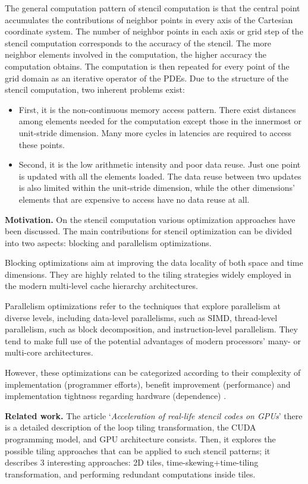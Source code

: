 \documentclass[conference]{IEEEtran}
\newcommand{\mypar}[1]{{\bf #1.}}
\begin{document}
The general computation pattern of stencil computation is that the central point accumulates the contributions of neighbor points in every axis of the Cartesian coordinate system.\cite{su-zhang-mei} The number of neighbor points in each axis or grid step of the stencil computation corresponds to the accuracy of the stencil. The more neighbor elements involved in the computation, the higher accuracy the computation obtains. The computation is then repeated for every point of the grid domain as an iterative operator of the PDEs. Due to the structure of the stencil computation, two inherent problems exist:
\begin{itemize}
	\item First, it is the non-continuous memory access pattern. There exist distances among elements needed for the computation except those in the innermost or unit-stride dimension. Many more cycles in latencies are required to access these points. 
	\item Second, it is the low arithmetic intensity and poor data reuse. Just one point is updated with all the elements loaded. The data reuse between two updates is also limited within the unit-stride dimension, while the other dimensions' elements that are expensive to access have no data reuse at all.
\end{itemize}


\mypar{Motivation} 
On the stencil computation various optimization approaches have been discussed. The main contributions for stencil optimization can be divided into two aspects: blocking and parallelism optimizations.\cite{su-zhang-mei}

Blocking optimizations aim at improving the data locality of both space and time dimensions. They are highly related to the tiling strategies widely employed in the modern multi-level cache hierarchy architectures.
 
Parallelism optimizations refer to the techniques that explore parallelism at diverse levels, including data-level parallelisms, such as SIMD, thread-level parallelism, such as block decomposition, and instruction-level parallelism. They tend to make full use of the potential advantages of modern processors' many- or multi-core architectures. 

However, these optimizations can be categorized according to their complexity of implementation (programmer efforts), benefit improvement (performance) and implementation tightness regarding hardware (dependence) \cite{cruz}.

\mypar{Related work} 
The article `\textit{Acceleration of real-life stencil codes on GPUs}' \cite{barigou} there is a detailed description of the loop tiling transformation, the CUDA programming model, and GPU architecture consists. Then, it explores the possible tiling approaches that can be applied to such stencil patterns; it describes 3 interesting approaches: 2D tiles, time-skewing+time-tiling transformation, and performing redundant computations inside tiles.
\end{document}
